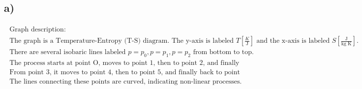 

\subsection*{a)}

\[
\begin{array}{c}
\begin{array}{c}
\text{Graph description:} \\
\text{The graph is a Temperature-Entropy (T-S) diagram. The y-axis is labeled } T \left[ \frac{K}{\text{J}} \right] \text{ and the x-axis is labeled } S \left[ \frac{\text{J}}{\text{kg K}} \right]. \\
\text{There are several isobaric lines labeled } p = p_0, p = p_1, p = p_2 \text{ from bottom to top.} \\
\text{The process starts at point O, moves to point 1, then to point 2, and finally to point 3.} \\
\text{From point 3, it moves to point 4, then to point 5, and finally back to point O.} \\
\text{The lines connecting these points are curved, indicating non-linear processes.}
\end{array}
\end{array}
\]